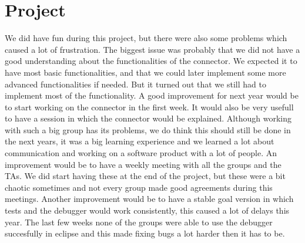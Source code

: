 \section {Project}
We did have fun during this project, but there were also some problems which caused a lot of frustration. The biggest issue was probably that we did not have a good understanding about the functionalities of the connector. We expected it to have most basic functionalities, and that we could later implement some more advanced functionalities if needed. But it turned out that we still had to implement most of the functionality. A good improvement for next year would be to start working on the connector in the first week. It would also be very usefull to have a session in which the connector would be explained. Although working with such a big group has its problems, we do think this should still be done in the next years, it was a big learning experience and we learned a lot about communication and working on a software product with a lot of people. An improvement would be to have a weekly meeting with all the groups and the TAs. We did start having these at the end of the project, but these were a bit chaotic sometimes and not every group made good agreements during this meetings. Another improvement would be to have a stable goal version in which tests and the debugger would work consistently, this caused a lot of delays this year. The last few weeks none of the groups were able to use the debugger succesfully in eclipse and this made fixing bugs a lot harder then it has to be.